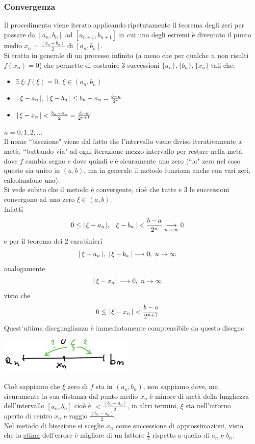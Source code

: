 \documentclass[12pt]{article}
\DeclarePairedDelimiter{\abs}{\lvert}{\rvert}
\begin{document}
\subsubsection{Convergenza}
Il procedimento viene iterato applicando ripetutamente il teorema degli zeri per passare da $[a_n,b_n]$ ad $[a_{n+1},b_{n+1}]$ in cui uno degli estremi è diventato il punto medio $x_n=\frac{(a_n+b_n)}{2}$ di $[a_n,b_n]$.\\
Si tratta in generale di un processo infinito (a meno che per qualche $n$ non risulti $f(x_n)=0$) che permette di costruire 3 successioni $\{ a_n \} , \{ b_n \} , \{ x_n \} $ tali che:
\begin{itemize}
    \item $\exists\ \xi : f(\xi)=0, \ \xi \in (a_n,b_n)$
    \item $\abs{\,\xi - a_n\,}, \ \abs{\,\xi - b_n\,} \le b_n-a_n=\frac{b-a}{2^n}$
    \item $\abs{\,\xi - x_n\,} < \frac{b_n - a_n}{2} = \frac{b-a}{2^{n+1}}$
\end{itemize}
$n=0,1,2,\dots$ \\
Il nome ``bisezione" viene dal fatto che l'intervallo viene diviso iterativamente a metà, ``buttando via" ad ogni iterazione mezzo intervallo per restare nella metà dove $f$ cambia segno e dove quindi c'è sicuramente uno zero (``lo" zero nel caso questo sia unico in $(a,b)$, ma in generale il metodo funziona anche con vari zeri, calcolandone uno). \\
Si vede subito che il metodo è convergente, cioè che tutte e 3 le successioni convergono ad uno zero $\xi \in (a,b)$.\\
Infatti
\[0 \le \abs{\,\xi - a_n\,}, \ \abs{\,\xi - b_n\,} < \frac{b-a}{2^n}\underset{n\to \infty}{\longrightarrow}  0\]
e per il teorema dei 2 carabinieri
\[\abs{\,\xi - a_n\,}, \ \abs{\,\xi - b_n\,} \longrightarrow 0, \ n \rightarrow \infty\]
analogamente
\[\abs{\,\xi - x_n\,} \longrightarrow 0, \ n \rightarrow \infty\]
visto che 
\[0 \le \abs{\,\xi - x_n\,} < \frac{b-a}{2^{n+1}}\]
Quest'ultima diseguaglianza è immediatamente comprensibile da questo disegno
\begin{center}
    \includegraphics[width=0.5\textwidth]{6.png}\par
\end{center}
Cioè sappiamo che $\xi$ zero di $f$ sta in $(a_n, b_n)$, non sappiamo dove, ma sicuramente la sua distanza dal punto medio $x_n$ è minore di metà della lunghezza dell'intervallo $[a_n, b_n]$ cioè è $< \frac{(b_n - a_n)}{2}$, in altri termini, $\xi$ sta nell'intorno aperto di centro $x_n$ e raggio $\frac{(b_n - a_n)}{2}$. \\
Nel metodo di bisezione si sceglie $x_n$ come successione di approssimazioni, visto che la \uline{stima} dell'errore è migliore di un fattore $\frac{1}{2}$ rispetto a quella di $a_n$ e $b_n$.
\end{document}
